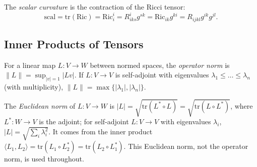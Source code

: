 \begin{definition}
  \label{def:pet-ch1-scalar-curvature}
  \leanok
  The \emph{scalar curvature} is the contraction of the Ricci tensor:
  \[
    \mathrm{scal}=\mathrm{tr}(\mathrm{Ric})=\mathrm{Ric}^i_i=R^i_{iks}g^{sk}
    =\mathrm{Ric}_{ik}g^{ki}=R_{ijkl}g^{ik}g^{jl}.
  \]
\end{definition}

\subsection{Inner Products of Tensors}

\begin{definition}
  \label{def:pet-ch1-operator-norm}
  \leanok
  For a linear map $L:V\to W$ between normed spaces, the \emph{operator norm} is
  $\|L\|=\sup_{|v|=1}|Lv|$. If $L:V\to V$ is self-adjoint with eigenvalues
  $\lambda_1\le\dots\le\lambda_n$ (with multiplicity), $\|L\|=\max\{|\lambda_1|,|\lambda_n|\}$.
\end{definition}

\begin{definition}
  \label{def:pet-ch1-euclidean-norm}
  \leanok
  The \emph{Euclidean norm} of $L:V\to W$ is
  $|L|=\sqrt{\mathrm{tr}(L^*\circ L)}=\sqrt{\mathrm{tr}(L\circ L^*)}$, where
  $L^*:W\to V$ is the adjoint; for self-adjoint $L:V\to V$ with eigenvalues
  $\lambda_i$, $|L|=\sqrt{\sum_i\lambda_i^2}$. It comes from the inner product
  $\langle L_1,L_2\rangle=\mathrm{tr}(L_1\circ L_2^*)=\mathrm{tr}(L_2\circ L_1^*)$.
  This Euclidean norm, not the operator norm, is used throughout.
\end{definition}

